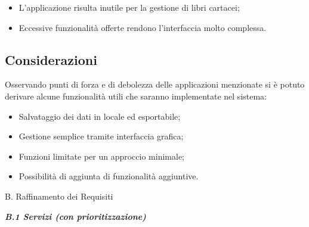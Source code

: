 \begin{itemize}
\item
  L'applicazione risulta inutile per la gestione di libri cartacei;
\item
  Eccessive funzionalità offerte rendono l'interfaccia molto complessa.
\end{itemize}

\subsection{Considerazioni}\label{considerazioni}

Osservando punti di forza e di debolezza delle applicazioni menzionate
si è potuto derivare alcune funzionalità utili che saranno implementate
nel sistema:

\begin{itemize}
\item
  Salvataggio dei dati in locale ed esportabile;
\item
  Gestione semplice tramite interfaccia grafica;
\item
  Funzioni limitate per un approccio minimale;
\item
  Possibilità di aggiunta di funzionalità aggiuntive.
\end{itemize}

B. Raffinamento dei Requisiti

\emph{\textbf{B.1 Servizi (con prioritizzazione)}}

